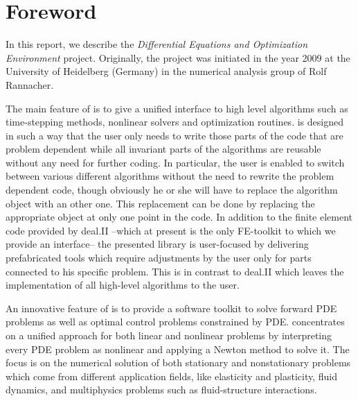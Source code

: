 \chapter{Foreword}
In this report, we describe the \dope{}
\textit{Differential Equations and  Optimization Environment} project. 
Originally, the project was initiated in the year 2009 at the 
University of Heidelberg (Germany) in the numerical analysis
group of Rolf Rannacher. 

The main feature of \dope{} is to give a unified interface to high level 
algorithms such as 
time-stepping methods, nonlinear solvers and optimization routines. 
\dope{} is designed in such a way that the user only needs to write those parts
of the code that are problem dependent while all invariant 
parts of the algorithms
are reusable without any need for further coding.
In particular, the user is enabled to switch between various different 
algorithms without the need to rewrite the problem dependent code, 
though obviously he or she will
have to replace the algorithm object with an other one. 
This replacement can be done by replacing the appropriate object at only
one point in the code.
In addition to the finite element code provided by deal.II --which at present is the only FE-toolkit to which we provide an 
interface-- 
the presented library
\dope{} is user-focused by delivering
prefabricated tools which require adjustments by the user only for parts
connected to his specific problem. 
This is in contrast to deal.II which leaves the implementation of all high-level algorithms to the user.

An innovative feature of \dope{} is to provide a software toolkit to solve forward PDE
problems as well as optimal control problems constrained by PDE. 
\dope{} concentrates on a unified approach for both linear and nonlinear
problems by interpreting every PDE problem as nonlinear and applying a
Newton method to solve it. 
The focus is on the numerical solution of both stationary and nonstationary
problems which come from different application fields, like elasticity and
plasticity, fluid dynamics, and multiphysics problems such as 
fluid-structure interactions.


